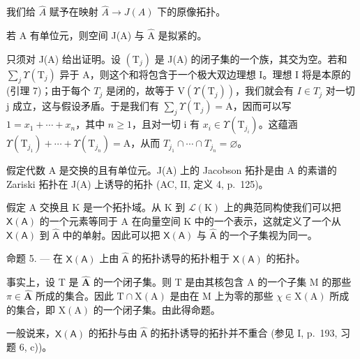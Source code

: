 我们给 \(\hat{A}\) 赋予在映射 \(\hat{A} \rightarrow J(A)\) 下的原像拓扑。

若 A 有单位元，则空间 J(A) 与 \(\hat{\mathrm{A}}\) 是拟紧的。

只须对 J(A) 给出证明。设 \((\mathrm{T}_{j})\) 是 J(A) 的闭子集的一个族，其交为空。若和 \(\sum_{j}\Upsilon(\mathrm{T}_{j})\) 异于 A，则这个和将包含于一个极大双边理想 I。理想 I 将是本原的 (引理 7)；由于每个 \(T_{j}\) 是闭的，故等于 \(\mathrm{V}(\Upsilon(\mathrm{T}_{j}))\)，我们就会有 \(I\in T_{j}\) 对一切 j 成立，这与假设矛盾。于是我们有 \(\sum_{j}\Upsilon(\mathrm{T}_{j})=\mathrm{A}\)，因而可以写 \(1=x_{1}+\cdots+x_{n}\)，其中 \(n\geqslant1\)，且对一切 i 有 \(x_{i}\in\Upsilon(\mathrm{T}_{j_{i}})\)。这蕴涵 \(\Upsilon(\mathrm{T}_{j_{1}})+\cdots+\Upsilon(\mathrm{T}_{j_{n}})=\mathrm{A}\)，从而 \(T_{j_{1}}\cap\cdots\cap T_{j_{n}}=\varnothing\)。

假定代数 A 是交换的且有单位元。J(A) 上的 Jacobson 拓扑是由 A 的素谱的 Zariski 拓扑在 J(A) 上诱导的拓扑 (AC, II, 定义 4, p.~125)。

假定 A 交换且 K 是一个拓扑域。从 K 到 \(\mathcal{L}(\mathrm{K})\) 上的典范同构使我们可以把 \(\mathsf{X}(\mathsf{A})\) 的一个元素等同于 A 在向量空间 K 中的一个表示，这就定义了一个从 \(\mathsf{X}(\mathsf{A})\) 到 \(\widehat{\mathsf{A}}\) 中的单射。因此可以把 \(\mathsf{X}(\mathsf{A})\) 与 \(\widehat{\mathsf{A}}\) 的一个子集视为同一。

命题 5. — 在 \(\mathsf{X}(\mathsf{A})\) 上由 \(\widehat{\mathsf{A}}\) 的拓扑诱导的拓扑粗于 \(\mathsf{X}(\mathsf{A})\) 的拓扑。

事实上，设 T 是 \(\widehat{\mathbf{A}}\) 的一个闭子集。则 T 是由其核包含 A 的一个子集 M 的那些 \(\pi \in \widehat{\mathbf{A}}\) 所成的集合。因此 \(\mathrm{T} \cap \mathrm{X}(\mathrm{A})\) 是由在 M 上为零的那些 \(\chi \in \mathrm{X}(\mathrm{A})\) 所成的集合，即 \(\mathrm{X}(\mathrm{A})\) 的一个闭子集。由此得命题。

一般说来，\(\mathsf{X}(\mathsf{A})\) 的拓扑与由 \(\widehat{\mathsf{A}}\) 的拓扑诱导的拓扑并不重合 (参见 I, p.~193, 习题 6, c))。

